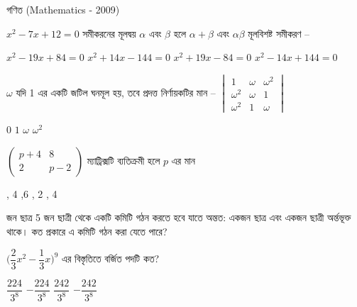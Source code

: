 \documentclass[addpoints]{exam}
\begin{document}
\begin{LARGE}
\begin{center}
গণিত (Mathematics - 2009)
\end{center}
\end{LARGE}
\begin{questions}

\question $ x^{2}-7x+12=0 $  সমীকরনের মূলদ্বয় $       \alpha $ এবং $ \beta $ হলে $ \alpha
+\beta $ এবং $ \alpha\beta $ মূলবিশষ্ট সমীকরণ –

\begin{oneparchoices}
\choice $ x^{2}-19x+84=0 $
\choice $ x^{2}+14x-144=0 $
\choice $ x^{2}+19x-84=0 $
\choice $ x^{2}-14x+144=0 $
\end{oneparchoices}

\question $ \omega $ যদি 1 এর একটি জটিল ঘনমূল হয়, তবে প্রদত্ত নির্ণায়কটির মান – $ \begin{vmatrix}
1 & \omega & \omega^{2} \\
\omega^{2} & \omega & 1\\
\omega^{2} & 1 & \omega
\end{vmatrix} $  

\begin{oneparchoices}
\choice $ 0 $
\choice $ 1 $
\choice $ \omega $
\choice $ \omega^{2} $
\end{oneparchoices}

\question  $\begin{pmatrix}
p+4 & 8 \\
2 & p-2
\end{pmatrix} $ ম্যাট্রিক্সটি ব্যতিক্রমী হলে $ p $ এর মান

\begin{oneparchoices}
, 4
,6
, 2
, 4
\end{oneparchoices}

 জন ছাত্র 5 জন ছাত্রী থেকে একটি কমিটি গঠন করতে হবে যাতে অন্তত: একজন ছাত্র এবং একজন ছাত্রী অর্ন্তভূক্ত থাকে। কত প্রকারে এ কমিটি গঠন করা যেতে পারে?

\begin{oneparchoices}
\end{oneparchoices}

\question $ \Big(\dfrac{2}{3} x^{2}-\dfrac{1}{3}x\Big)^{9} $ এর বিস্তৃতিতে বর্জিত পদটি কত?

\begin{oneparchoices}
\choice $ \dfrac{224}{3^{8}} $
\choice $ -\dfrac{224}{3^{8}} $
\choice $ \dfrac{242}{3^{8}} $
\choice $ -\dfrac{242}{3^{8}} $


\end{oneparchoices}
\end{questions}
\end{document}

